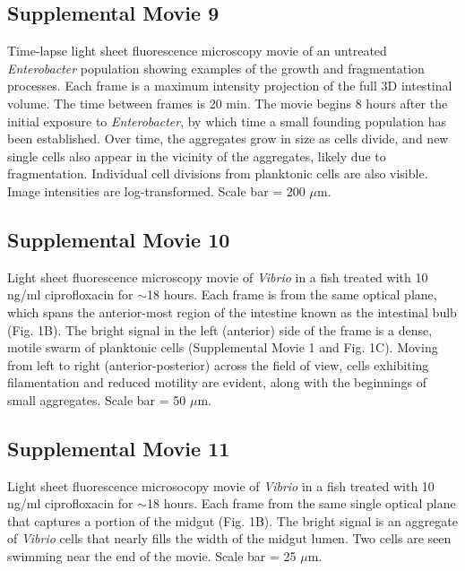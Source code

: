 {{{{{{{{{\subsection*{Supplemental Movie 9}
Time-lapse light sheet fluorescence microscopy movie of an untreated \textit{Enterobacter} population showing examples of the growth and fragmentation processes. Each frame is a maximum intensity projection of the full 3D intestinal volume. The time between frames is 20 min. The movie begins 8 hours after the initial exposure to \textit{Enterobacter}, by which time a small founding population has been established. Over time, the aggregates grow in size as cells divide, and new single cells also appear in the vicinity of the aggregates, likely due to fragmentation. Individual cell divisions from planktonic cells are also visible. Image intensities are log-transformed. Scale bar = 200 $\mu$m.

\subsection*{Supplemental Movie 10}
Light sheet fluorescence microscopy movie of \textit{Vibrio} in a fish treated with 10 ng/ml ciprofloxacin for $\sim$18 hours. Each frame is from the same optical plane, which spans the anterior-most region of the intestine known as the intestinal bulb (Fig. 1B). The bright signal in the left (anterior) side of the frame is a dense, motile swarm of planktonic cells (Supplemental Movie 1 and Fig. 1C). Moving from left to right (anterior-posterior) across the field of view, cells exhibiting filamentation and reduced motility are evident, along with the beginnings of small aggregates. Scale bar = 50 $\mu$m.

\subsection*{Supplemental Movie 11}
Light sheet fluorescence microsocopy movie of \textit{Vibrio} in a fish treated with 10 ng/ml ciprofloxacin for $\sim$18 hours. Each frame from the same single optical plane that captures a portion of the midgut (Fig. 1B). The bright signal is an aggregate of \textit{Vibrio} cells that nearly fills the width of the midgut lumen. Two cells are seen swimming near the end of the movie. Scale bar = 25 $\mu$m.






}}}}}}}}}
